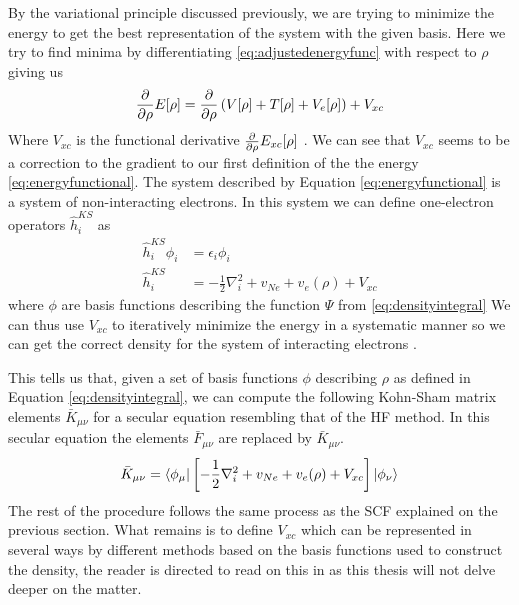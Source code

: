 \documentclass[../master_thesis.tex]{subfiles}
\begin{document}
By the variational principle discussed previously, we are trying to minimize the energy
to get the best representation of the system with the given basis. Here we try to
find minima by differentiating \ref{eq:adjustedenergyfunc} with respect to $\rho$ giving us
\begin{align}\label{eq:energyderiv}
   \frac{\partial}{\partial \rho}E[\rho] = \frac{\partial}{\partial \rho}\left( V[\rho] + T[\rho] + V_{e}[\rho]\right) + V_{xc}
\end{align}
Where $V_{xc}$ is the functional derivative $\frac{\partial}{\partial \rho}E_{xc}[\rho]$ \cite{Cramer:2004}.
We can see that $V_{xc}$ seems to be a correction to the gradient to our first definition
of the the energy \ref{eq:energyfunctional}. The system described by Equation
\ref{eq:energyfunctional} is a system of non-interacting electrons. In this
system we can define one-electron operators $\hat{h}_i^{KS}$ as
\begin{align}
  \hat{h}_i^{KS} \phi_i &= \epsilon_i \phi_i \\
  \hat{h}_i^{KS} &= - \frac{1}{2}\nabla^2_i + v_{Ne} + v_e(\rho) + V_{xc}
\end{align}
where $\phi$ are basis functions describing the function $\Psi$ from \ref{eq:densityintegral}
We can thus use $V_{xc}$ to iteratively minimize the energy in a systematic manner so we can
get the correct density for the system of interacting electrons \cite{Cramer:2004}.

This tells us that, given a set of basis functions $\phi$ describing
$\rho$ as defined in Equation \ref{eq:densityintegral}, we can compute the following
Kohn-Sham  matrix elements $\bar{K}_{\mu\nu}$ for a secular equation resembling that of the \ac{HF}
method. In this secular equation the elements $\bar{F}_{\mu\nu}$ are replaced by $\bar{K}_{\mu\nu}$.
\begin{equation}
  \bar{K}_{\mu\nu} = \braket{\phi_\mu|\left[- \frac{1}{2}\nabla^2_i + v_{Ne} + v_e(\rho) + V_{xc}\right]|\phi_\nu}
\end{equation}
The rest of the procedure follows the same process as the \ac{SCF} explained on
the previous section.
What remains is to define $V_{xc}$ which can be represented in several ways by different methods
based on the basis functions used to construct the density, the reader is directed to
read on this in \cite{Cramer:2004} as this thesis will not delve deeper on the
matter.


\biblio
\end{document}
